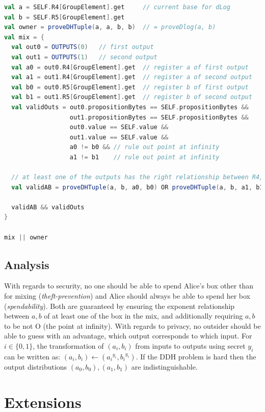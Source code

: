 \documentclass[runningheads]{llncs}
\begin{document}
\begin{lstlisting}[language=Scala,caption={Mix-script},label=mixScript]
val a = SELF.R4[GroupElement].get     // current base for dLog
val b = SELF.R5[GroupElement].get
val owner = proveDHTuple(a, a, b, b)  // = proveDlog(a, b)
val mix = {
  val out0 = OUTPUTS(0)   // first output
  val out1 = OUTPUTS(1)   // second output
  val a0 = out0.R4[GroupElement].get  // register a of first output
  val a1 = out1.R4[GroupElement].get  // register a of second output
  val b0 = out0.R5[GroupElement].get  // register b of first output
  val b1 = out1.R5[GroupElement].get  // register b of second output
  val validOuts = out0.propositionBytes == SELF.propositionBytes &&
                  out1.propositionBytes == SELF.propositionBytes &&
                  out0.value == SELF.value && 
                  out1.value == SELF.value &&
                  a0 != b0 && // rule out point at infinity
                  a1 != b1    // rule out point at infinity        
      
  // at least one of the outputs has the right relationship between R4, R5
  val validAB = proveDHTuple(a, b, a0, b0) OR proveDHTuple(a, b, a1, b1)
  
  validAB && validOuts
}

mix || owner
\end{lstlisting}

\subsection{Analysis}

With regards to security, no one should be able to spend Alice's box other than for mixing ({\em theft-prevention}) and Alice should always be able to spend her box ({\em spendability}). Both are guaranteed by ensuring the exponent relationship between $a, b$ of at least one of the box in the mix, and additionally requiring $a, b$ to be not O (the point at infinity). With regards to privacy, no outsider should be able to guess with an advantage, which output corresponds to which input. For $i \in \{0, 1\}$, the transformation of $(a_i, b_i)$ from inputs to outputs using secret $y_i$ can be written as:
 $(a_i, b_i) \leftarrow ({a_i}^{y_i}, {b_i}^{y_i})$. If the DDH problem is hard then the output distributions $(a_0, b_0), (a_1, b_1)$ are indistinguishable.

\section{Extensions}
\end{document}
